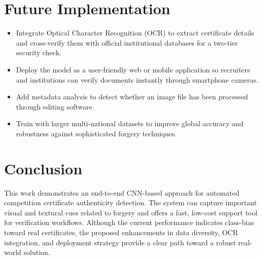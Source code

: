 \documentclass[12pt,a4paper]{article}
\begin{document}
\section{Future Implementation}
\begin{itemize}[leftmargin=*]
    \item Integrate Optical Character Recognition (OCR) to extract certificate details and cross-verify them with official institutional databases for a two-tier security check.
    \item Deploy the model as a user-friendly web or mobile application so recruiters and institutions can verify documents instantly through smartphone cameras.
    \item Add metadata analysis to detect whether an image file has been processed through editing software.
    \item Train with larger multi-national datasets to improve global accuracy and robustness against sophisticated forgery techniques.
\end{itemize}

\section{Conclusion}
This work demonstrates an end-to-end CNN-based approach for automated competition certificate authenticity detection. The system can capture important visual and textural cues related to forgery and offers a fast, low-cost support tool for verification workflows. Although the current performance indicates class-bias toward real certificates, the proposed enhancements in data diversity, OCR integration, and deployment strategy provide a clear path toward a robust real-world solution.

\newpage


\end{document}
